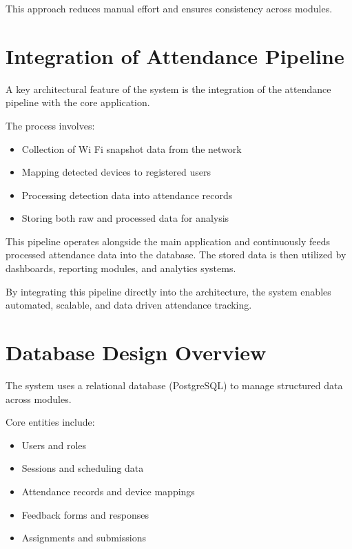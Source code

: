 This approach reduces manual effort and ensures consistency across modules.



\section{Integration of Attendance Pipeline}

A key architectural feature of the system is the integration of the attendance pipeline with
the core application.

The process involves:

\begin{itemize}
    \item Collection of Wi Fi snapshot data from the network
    \item Mapping detected devices to registered users
    \item Processing detection data into attendance records
    \item Storing both raw and processed data for analysis
\end{itemize}

This pipeline operates alongside the main application and continuously feeds processed
attendance data into the database. The stored data is then utilized by dashboards, reporting
modules, and analytics systems.

By integrating this pipeline directly into the architecture, the system enables automated,
scalable, and data driven attendance tracking.

\section{Database Design Overview}

The system uses a relational database (PostgreSQL) to manage structured data across
modules.

Core entities include:

\begin{itemize}
    \item Users and roles
    \item Sessions and scheduling data
    \item Attendance records and device mappings
    \item Feedback forms and responses
    \item Assignments and submissions
\end{itemize}

